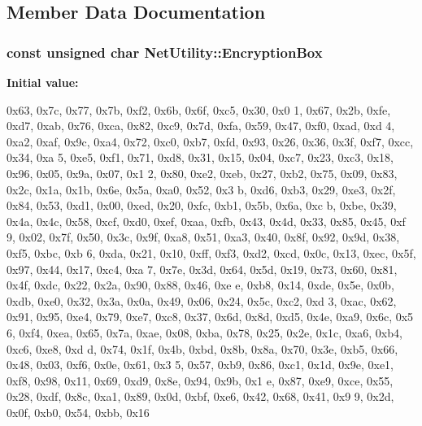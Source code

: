 \subsection{Member Data Documentation}
\hypertarget{class_net_utility_a4c0093017521d888c4510cc940ffa335}{
\subsubsection[{EncryptionBox}]{\setlength{\rightskip}{0pt plus 5cm}const unsigned char {\bf NetUtility::EncryptionBox}}}
\label{class_net_utility_a4c0093017521d888c4510cc940ffa335}
{\bfseries Initial value:}
\begin{DoxyCode}

        {
                        0x63, 0x7c, 0x77, 0x7b, 0xf2, 0x6b, 0x6f, 0xc5, 0x30, 0x0
      1, 0x67, 0x2b, 0xfe, 0xd7, 0xab, 0x76,
                        0xca, 0x82, 0xc9, 0x7d, 0xfa, 0x59, 0x47, 0xf0, 0xad, 0xd
      4, 0xa2, 0xaf, 0x9c, 0xa4, 0x72, 0xc0,
                        0xb7, 0xfd, 0x93, 0x26, 0x36, 0x3f, 0xf7, 0xcc, 0x34, 0xa
      5, 0xe5, 0xf1, 0x71, 0xd8, 0x31, 0x15,
                        0x04, 0xc7, 0x23, 0xc3, 0x18, 0x96, 0x05, 0x9a, 0x07, 0x1
      2, 0x80, 0xe2, 0xeb, 0x27, 0xb2, 0x75,
                        0x09, 0x83, 0x2c, 0x1a, 0x1b, 0x6e, 0x5a, 0xa0, 0x52, 0x3
      b, 0xd6, 0xb3, 0x29, 0xe3, 0x2f, 0x84,
                        0x53, 0xd1, 0x00, 0xed, 0x20, 0xfc, 0xb1, 0x5b, 0x6a, 0xc
      b, 0xbe, 0x39, 0x4a, 0x4c, 0x58, 0xcf,
                        0xd0, 0xef, 0xaa, 0xfb, 0x43, 0x4d, 0x33, 0x85, 0x45, 0xf
      9, 0x02, 0x7f, 0x50, 0x3c, 0x9f, 0xa8,
                        0x51, 0xa3, 0x40, 0x8f, 0x92, 0x9d, 0x38, 0xf5, 0xbc, 0xb
      6, 0xda, 0x21, 0x10, 0xff, 0xf3, 0xd2,
                        0xcd, 0x0c, 0x13, 0xec, 0x5f, 0x97, 0x44, 0x17, 0xc4, 0xa
      7, 0x7e, 0x3d, 0x64, 0x5d, 0x19, 0x73,
                        0x60, 0x81, 0x4f, 0xdc, 0x22, 0x2a, 0x90, 0x88, 0x46, 0xe
      e, 0xb8, 0x14, 0xde, 0x5e, 0x0b, 0xdb,
                        0xe0, 0x32, 0x3a, 0x0a, 0x49, 0x06, 0x24, 0x5c, 0xc2, 0xd
      3, 0xac, 0x62, 0x91, 0x95, 0xe4, 0x79,
                        0xe7, 0xc8, 0x37, 0x6d, 0x8d, 0xd5, 0x4e, 0xa9, 0x6c, 0x5
      6, 0xf4, 0xea, 0x65, 0x7a, 0xae, 0x08,
                        0xba, 0x78, 0x25, 0x2e, 0x1c, 0xa6, 0xb4, 0xc6, 0xe8, 0xd
      d, 0x74, 0x1f, 0x4b, 0xbd, 0x8b, 0x8a,
                        0x70, 0x3e, 0xb5, 0x66, 0x48, 0x03, 0xf6, 0x0e, 0x61, 0x3
      5, 0x57, 0xb9, 0x86, 0xc1, 0x1d, 0x9e,
                        0xe1, 0xf8, 0x98, 0x11, 0x69, 0xd9, 0x8e, 0x94, 0x9b, 0x1
      e, 0x87, 0xe9, 0xce, 0x55, 0x28, 0xdf,
                        0x8c, 0xa1, 0x89, 0x0d, 0xbf, 0xe6, 0x42, 0x68, 0x41, 0x9
      9, 0x2d, 0x0f, 0xb0, 0x54, 0xbb, 0x16
        }
\end{DoxyCode}


